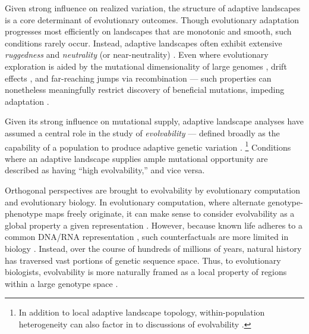 Given strong influence on realized variation, the structure of adaptive landscapes is a core determinant of evolutionary outcomes.
Though evolutionary adaptation progresses most efficiently on landscapes that are monotonic and smooth, such conditions rarely occur.
Instead, adaptive landscapes often exhibit extensive \textit{ruggedness} \citep{papkou2023rugged,reidys2001neutrality} and \textit{neutrality} (or near-neutrality) \citep{kimura1983neutral,kimura1991neutral,ohta1992nearly,ohta2002near}.
Even where evolutionary exploration is aided by the mutational dimensionality of large genomes \citep{franke2011evolutionary,greenbury2022structure}, drift effects \citep{reidys2001neutrality,ahnert2017structural,croitoru2022punctuated,galvanlopez2011neutrality,jorg2008neutral,huynen1996smoothness,shackleton2000investigation,huynen1996exploring,amitai2007latent,banzhaf2006evolution,hu2025neutrality,oliveto2017how,wagner2008robustness,wagner2013robustness,masel2010robustness,hu2018neutrality}, and far-reaching jumps via recombination \citep{li2024rapid,doerr2008crossover,fogel1994effectiveness} --- such properties can nonetheless meaningfully restrict discovery of beneficial mutations, impeding adaptation \citep{martin2013multiple,steinberg2016environmental,li2025probability,bank2022epistasis,neidhart2014adaptation,orr2005genetic,bershtein2008advances,van1999neutral}.

Given its strong influence on mutational supply, adaptive landscape analyses have assumed a central role in the study of \textit{evolvability} --- defined broadly as the capability of a population to produce adaptive genetic variation \citep{payne2018causes,kirschner1998evolvability,wilder2015reconciling,pigliucci2008evolvability}.
\unskip\footnote{%
In addition to local adaptive landscape topology, within-population heterogeneity can also factor in to discussions of evolvability \citep{wilder2015reconciling,houle1992comparing}.
}
Conditions where an adaptive landscape supplies ample mutational opportunity are described as having ``high evolvability,'' and vice versa.

Orthogonal perspectives are brought to evolvability by evolutionary computation and evolutionary biology.
In evolutionary computation, where alternate genotype-phenotype maps freely originate, it can make sense to consider evolvability as a global property a given representation \citep{tarapore2015evolvability}.
However, because known life adheres to a common DNA/RNA representation \citep{aguirre2018networked}, such counterfactuals are more limited in biology \citep{zhang2015evolution}.
Instead, over the course of hundreds of millions of years, natural history has traversed vast portions of genetic sequence space.
Thus, to evolutionary biologists, evolvability is more naturally framed as a local property of regions within a large genotype space \citep{wagner2017information,wagner2023evolvability}.

